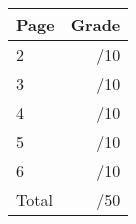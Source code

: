 \documentclass[12pt]{article}
\newcommand{\skipline}{\vspace{12pt}}
\begin{document}
\begin{table}[hbt]
\begin{center}
\begin{tabular}{|l|r|} \hline
Page&Grade\\
\hline \hline
\cline{1-2} 2 & \enspace\enspace\enspace\enspace\enspace\enspace/10\\
\cline{1-2} 3 & \enspace\enspace\enspace\enspace\enspace\enspace/10\\
\cline{1-2} 4 & \enspace\enspace\enspace\enspace\enspace\enspace/10\\
\cline{1-2} 5 & \enspace\enspace\enspace\enspace\enspace\enspace/10\\
\cline{1-2} 6 & \enspace\enspace\enspace\enspace\enspace\enspace/10\\
\cline{1-2} Total & \enspace\enspace\enspace\enspace\enspace\enspace/50\\
\hline
\end{tabular}

\skipline

\skipline

\skipline


\end{center}
\end{table}
\newpage
\end{document}
